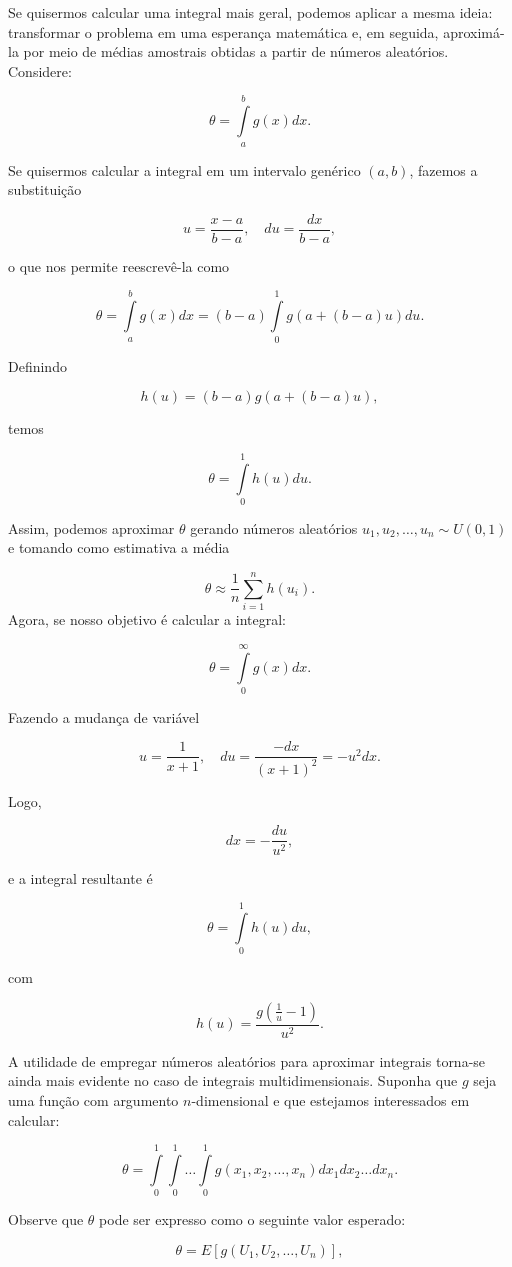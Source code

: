 \documentclass[
  letterpaper,
  DIV=11,
  numbers=noendperiod]{scrreprt}
\begin{document}
Se quisermos calcular uma integral mais geral, podemos aplicar a mesma
ideia: transformar o problema em uma esperança matemática e, em seguida,
aproximá-la por meio de médias amostrais obtidas a partir de números
aleatórios. Considere:

\[\theta = \int\limits_{a}^{b}g(x) dx.\]

Se quisermos calcular a integral em um intervalo genérico \((a, b)\),
fazemos a substituição

\[u = \frac{x - a}{b-a}, \quad du = \frac{dx}{b-a},\]

o que nos permite reescrevê-la como

\[\theta = \int\limits_{a}^{b}g(x) dx = (b-a)\int\limits_{0}^{1}g(a + (b-a)u) du.\]

Definindo

\[h(u) = (b-a)g(a + (b-a)u),\]

temos

\[\theta = \int\limits_{0}^{1}h(u) du.\]

Assim, podemos aproximar \(\theta\) gerando números aleatórios
\(u_1, u_2, \dots, u_n \sim U(0, 1)\) e tomando como estimativa a média

\[\theta \approx \frac{1}{n}\sum\limits_{i=1}^{n}h(u_i).\] Agora, se
nosso objetivo é calcular a integral:

\[\theta = \int\limits_{0}^{\infty}g(x) dx.\]

Fazendo a mudança de variável

\[u = \frac{1}{x+1}, \quad du = \frac{-dx}{(x+1)^2} = -u^2 dx.\]

Logo,

\[dx = -\frac{du}{u^2},\]

e a integral resultante é

\[\theta = \int\limits_{0}^{1}h(u) du,\]

com

\[h(u) = \frac{g\left(\frac{1}{u} - 1\right)}{u^2}.\]

A utilidade de empregar números aleatórios para aproximar integrais
torna-se ainda mais evidente no caso de integrais multidimensionais.
Suponha que \(g\) seja uma função com argumento \(n\)-dimensional e que
estejamos interessados em calcular:

\[\theta = \int\limits_{0}^{1}\int\limits_{0}^{1}\dots\int\limits_{0}^{1} g(x_1, x_2, \dots, x_n)dx_1 dx_2 \dots dx_n.\]

Observe que \(\theta\) pode ser expresso como o seguinte valor esperado:

\[\theta = E[g(U_1, U_2, \dots, U_n)],\]
\end{document}
